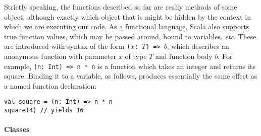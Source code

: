 Strictly speaking, the functions described so far are really methods of some object, although exactly which object that is might be hidden by the context in which we are executing our code. As a functional language, Scala also supports true function values, which may be passed around, bound to variables, \textit{etc}. These are introduced with syntax of the form \texttt{($x$:\ $T$) => $b$}, which describes an anonymous function with parameter $x$ of type $T$ and function body $b$. For example, \texttt{(n:\ Int) => n * n} is a function which takes an integer and returns its square. Binding it to a variable, as follows, produces essentially the same effect as a named function declaration:
\begin{verbatim}
val square = (n: Int) => n * n
square(4) // yields 16
\end{verbatim}

\paragraph{Classes}

